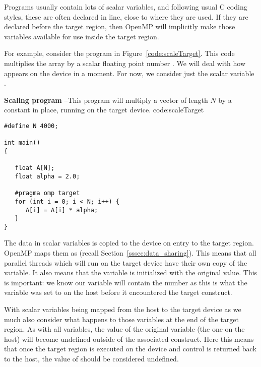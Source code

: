 
Programs usually contain lots of scalar variables, and following usual C coding styles, these are often declared in line, close to where they are used.
If they are declared before the target region, then OpenMP will implicitly make those variables available for use inside the target region.

For example, consider the program in Figure~\ref{code:scaleTarget}.
This code multiplies the array  by a scalar floating point number .
We will deal with how  appears on the device in a moment.
For now, we consider just the scalar variable .

\begin{CodeExample}%
{\textbf{Scaling program} --\small This program will multiply a vector of length $N$
by a constant in place, running on the target device.
}%
{code:scaleTarget}
\begin{lstlisting}
#define N 4000;

int main()
{

   float A[N];
   float alpha = 2.0;

   #pragma omp target
   for (int i = 0; i < N; i++) {
      A[i] = A[i] * alpha;
   }
}	  
\end{lstlisting}
\end{CodeExample}

The data in scalar variables is copied to the device on entry to the target region.
OpenMP maps them as  (recall Section~\ref{sssec:data_sharing}).
This means that all parallel threads which will run on the target device have their own copy of the variable.
It also means that the variable is initialized with the original value.
This is important: we know our  variable will contain the number  as this is what the variable was set to on the host before it encountered the target construct.

With scalar variables being mapped from the host to the target device as  we much also consider what happens to those variables at the end of the target region.
As with all  variables, the value of the original variable (the one on the host) will become undefined outside of the associated construct.
Here this means that once the target region is executed on the device and control is returned back to the host, the value of  should be considered undefined.

